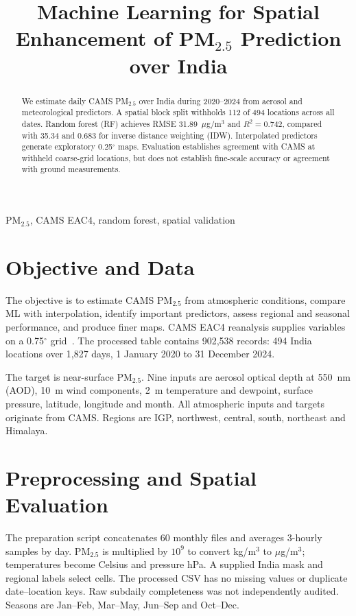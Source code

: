 \documentclass[conference]{IEEEtran}
\begin{document}
\title{Machine Learning for Spatial Enhancement of PM$_{2.5}$ Prediction over India}
\author{}
\maketitle
\begin{abstract}
We estimate daily CAMS PM$_{2.5}$ over India during 2020--2024 from aerosol and meteorological predictors. A spatial block split withholds 112 of 494 locations across all dates. Random forest (RF) achieves RMSE 31.89~$\mu$g/m$^3$ and $R^2=0.742$, compared with 35.34 and 0.683 for inverse distance weighting (IDW). Interpolated predictors generate exploratory 0.25$^\circ$ maps. Evaluation establishes agreement with CAMS at withheld coarse-grid locations, but does not establish fine-scale accuracy or agreement with ground measurements.
\end{abstract}
\begin{IEEEkeywords}PM$_{2.5}$, CAMS EAC4, random forest, spatial validation\end{IEEEkeywords}
\section{Objective and Data}
The objective is to estimate CAMS PM$_{2.5}$ from atmospheric conditions, compare ML with interpolation, identify important predictors, assess regional and seasonal performance, and produce finer maps. CAMS EAC4 reanalysis supplies variables on a 0.75$^\circ$ grid~\cite{cams}. The processed table contains 902,538 records: 494 India locations over 1,827 days, 1 January 2020 to 31 December 2024.

The target is near-surface PM$_{2.5}$. Nine inputs are aerosol optical depth at 550~nm (AOD), 10~m wind components, 2~m temperature and dewpoint, surface pressure, latitude, longitude and month. All atmospheric inputs and targets originate from CAMS. Regions are IGP, northwest, central, south, northeast and Himalaya.
\section{Preprocessing and Spatial Evaluation}
The preparation script concatenates 60 monthly files and averages 3-hourly samples by day. PM$_{2.5}$ is multiplied by $10^9$ to convert kg/m$^3$ to $\mu$g/m$^3$; temperatures become Celsius and pressure hPa. A supplied India mask and regional labels select cells. The processed CSV has no missing values or duplicate date--location keys. Raw subdaily completeness was not independently audited. Seasons are Jan--Feb, Mar--May, Jun--Sep and Oct--Dec.
\end{document}

